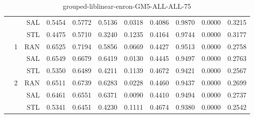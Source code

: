 \begin{center}
\begin{table}[htbp]
\begin{center}
\begin{tabular}{ | r | r | r | r | r | r | r | r | r | r | r |}
 &   & SAL & 0.5454 & 0.5772 & 0.5136 & 0.0318 & 0.4086 & 0.9870 & 0.0000 & 0.3215\\ \cline{3-11}
 &   & STL & 0.4475 & 0.5710 & 0.3240 & 0.1235 & 0.4164 & 0.9744 & 0.0000 & 0.3177\\ \cline{2-11}
 & \multirow{3}{*}{1} & RAN & 0.6525 & 0.7194 & 0.5856 & 0.0669 & 0.4427 & 0.9513 & 0.0000 & 0.2758\\ \cline{3-11}
 &   & SAL & 0.6549 & 0.6679 & 0.6419 & 0.0130 & 0.4445 & 0.9497 & 0.0000 & 0.2763\\ \cline{3-11}
 &   & STL & 0.5350 & 0.6489 & 0.4211 & 0.1139 & 0.4672 & 0.9421 & 0.0000 & 0.2567\\ \cline{2-11}
 & \multirow{3}{*}{2} & RAN & 0.6511 & 0.6739 & 0.6283 & 0.0228 & 0.4460 & 0.9437 & 0.0000 & 0.2699\\ \cline{3-11}
 &   & SAL & 0.6461 & 0.6551 & 0.6371 & 0.0090 & 0.4410 & 0.9494 & 0.0000 & 0.2737\\ \cline{3-11}
 &   & STL & 0.5341 & 0.6451 & 0.4230 & 0.1111 & 0.4674 & 0.9380 & 0.0000 & 0.2542\\ \cline{2-11}
\hline
\end{tabular}
\caption{grouped-liblinear-enron-GM5-ALL-ALL-75}
\end{center}
 \end{table}
\end{center}

